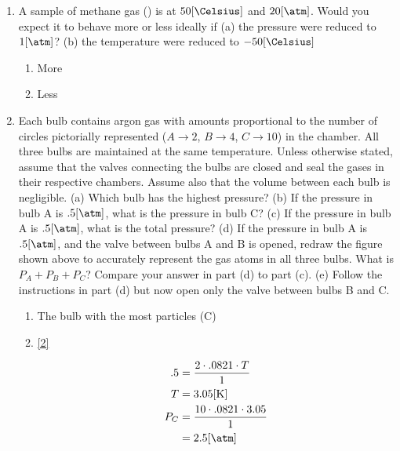 \documentclass[12pt]{article}
\begin{document}
\begin{enumerate}
  \item A sample of methane gas () is at $50[\si{\Celsius}]$ and $20[\si{\atm}]$. Would you expect it to behave more or less ideally if (a) the pressure were reduced to $1[\si{\atm}]$? (b) the temperature were reduced to $-50[\si{\Celsius}]$

    \begin{enumerate}

      \item More

      \item Less

    \end{enumerate}

    \newpage

    \setcounter{enumi}{85}

  \item Each bulb contains argon gas with amounts proportional to the number of circles pictorially represented ($A\rightarrow2$, $B\rightarrow4$, $C\rightarrow10$) in the chamber. All three bulbs are maintained at the same temperature. Unless otherwise stated, assume that the valves connecting the bulbs are closed and seal the gases in their respective chambers. Assume also that the volume between each bulb is negligible. (a) Which bulb has the highest pressure? (b) If the pressure in bulb A is $.5[\si{\atm}]$, what is the pressure in bulb C? (c) If the pressure in bulb A is $.5[\si{\atm}]$, what is the total pressure? (d) If the pressure in bulb A is $.5[\si{\atm}]$, and the valve between bulbs A and B is opened, redraw the figure shown above to accurately represent the gas atoms in all three bulbs. What is $P_A + P_B + P_C$? Compare your answer in part (d) to part (c). (e) Follow the instructions in part (d) but now open only the valve between bulbs B and C. 

    \begin{enumerate}

      \item The bulb with the most particles (C)

      \item \eqref{2}

        \begin{equation}
          \begin{split}
            .5&=\frac{2\cdot.0821\cdot T}{1}\\
            T&=3.05[\si{\kelvin}]\\
            P_{C}&=\frac{10\cdot.0821\cdot3.05}{1}\\
            &=2.5[\si{\atm}]
          \end{split}
          \label{2}
        \end{equation}


\end{enumerate}
\end{enumerate}
\end{document}
